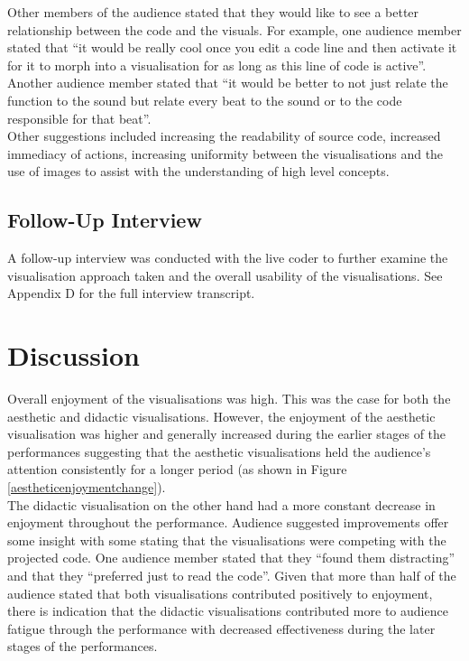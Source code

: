 \documentclass[12pt]{article}
\begin{document}
Other members of the audience stated that they would like to see a better relationship between the code and the visuals. For example, one audience member stated that ``it would be really cool once you edit a code line and then activate it for it to morph into a visualisation for as long as this line of code is active''. Another audience member stated that ``it would be better to not just relate the function to the sound but relate every beat to the sound or to the code responsible for that beat''.\\

Other suggestions included increasing the readability of source code, increased immediacy of actions, increasing uniformity between the visualisations and the use of images to assist with the understanding of high level concepts.\\

\subsection{Follow-Up Interview}

A follow-up interview was conducted with the live coder to further examine the visualisation approach taken and the overall usability of the visualisations. See Appendix D for the full interview transcript.

\section{Discussion}

Overall enjoyment of the visualisations was high. This was the case for both the aesthetic and didactic visualisations. However, the enjoyment of the aesthetic visualisation was higher and generally increased during the earlier stages of the performances suggesting that the aesthetic visualisations held the audience's attention consistently for a longer period (as shown in Figure \ref{aestheticenjoymentchange}).\\

The didactic visualisation on the other hand had a more constant decrease in enjoyment throughout the performance. Audience suggested improvements offer some insight with some stating that the visualisations were competing with the projected code. One audience member stated that they ``found them distracting'' and that they ``preferred just to read the code''. Given that more than half of the audience stated that both visualisations contributed positively to enjoyment, there is indication that the didactic visualisations contributed more to audience fatigue through the performance with decreased effectiveness during the later stages of the performances.\\
\end{document}
